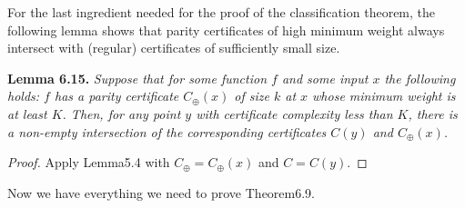 \documentclass[10pt,a4paper]{article}
\newenvironment{originalresult}[1]{\par\medskip\noindent\textbf{#1.}\itshape}{\par\medskip}
\begin{document}
For the last ingredient needed for the proof of the classification theorem, the following lemma shows that parity certificates of high minimum weight always intersect with (regular) certificates of sufficiently small size.
\begin{originalresult}{Lemma 6.15}
Suppose that for some function $f$ and some input $x$ the following holds: $f$ has a parity certificate $C_\oplus(x)$ of size $k$ at $x$ whose minimum weight is at least $K$. Then, for any point $y$ with certificate complexity less than $K$, there is a non-empty intersection of the corresponding certificates $C(y)$ and $C_\oplus(x)$.
\end{originalresult}
\begin{proof}
Apply Lemma5.4 with $C_\oplus=C_\oplus(x)$ and $C=C(y)$.
\end{proof}
Now we have everything we need to prove Theorem6.9.
\end{document}
